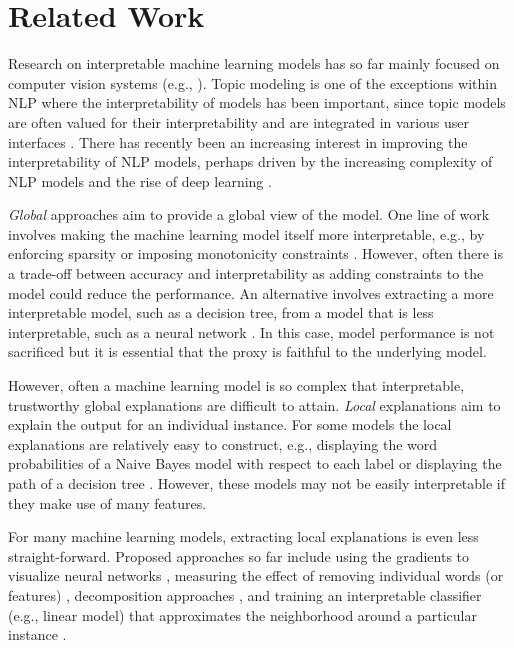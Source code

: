 \documentclass[11pt,a4paper]{article}
\begin{document}
 



\section{Related Work}
Research on interpretable machine learning models has so far mainly focused on  computer vision systems  (e.g., \citet{DBLP:journals/corr/SimonyanVZ13}). Topic modeling is one of the exceptions within NLP  where the interpretability of models has been important, since topic models are often valued for their interpretability and are  integrated in various user interfaces \cite{paul2016}.
There has recently been an increasing interest in improving the interpretability of NLP models, perhaps   driven by the increasing complexity of NLP models and 
the rise of deep learning \cite{manning2016computational}. 

\emph{Global} approaches aim to provide a global view of the model. One line of work involves making the machine learning model itself more interpretable, e.g., by enforcing sparsity or imposing monotonicity constraints  \cite{Freitas:2014:CCM:2594473.2594475}. However, often there is a trade-off between accuracy and interpretability as adding  constraints to the model could reduce the performance. 
An alternative involves extracting a more interpretable model, such as a decision tree, from a model that is less interpretable, such as a neural network \cite{craven1996extracting}. In this case,
model performance is not sacrificed but it is essential that the proxy is  faithful to the underlying model. 


However, often a machine learning model is so complex that interpretable, trustworthy global explanations are difficult to attain. \emph{Local} explanations aim to explain the output for an individual instance. 
For some models the local explanations are relatively easy to construct, e.g.,   displaying the word probabilities of a Naive Bayes model with respect to each label \cite{Kulesza:2015:PED:2678025.2701399} or  displaying the path of a decision tree \cite{Lim:2009:WWE:1518701.1519023}.  However,  these models may not be easily interpretable if they make use of many features.

For many machine learning models, extracting local explanations is even less straight-forward. Proposed approaches so far include using the gradients to visualize neural networks \cite{aubakirova-bansal:2016:EMNLP2016,li-EtAl:2016:N16-12,DBLP:journals/corr/SimonyanVZ13}, measuring the effect of removing individual words (or features)  \cite{li2016understanding,Martens:2014:EDD:2600518.2600523},  decomposition approaches \cite{arras2016explaining,ding-EtAl:2017:Long},
and training an interpretable classifier (e.g., linear model) that approximates the neighborhood around a particular instance \cite{Ribeiro:2016:WIT:2939672.2939778}.
\end{document}
